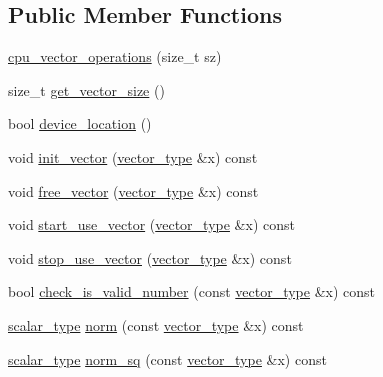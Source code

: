 \subsection*{Public Member Functions}
\begin{DoxyCompactItemize}
\item 
\hyperlink{structcpu__vector__operations_a7148d35e213ce857bd4317b9b7d13fc7}{cpu\-\_\-vector\-\_\-operations} (size\-\_\-t sz)
\item 
size\-\_\-t \hyperlink{structcpu__vector__operations_ab69afb698fb1beed0dc6cc33b7a556ba}{get\-\_\-vector\-\_\-size} ()
\item 
bool \hyperlink{structcpu__vector__operations_aa4a7a448ded0cac8ebc34881d9442912}{device\-\_\-location} ()
\item 
void \hyperlink{structcpu__vector__operations_a8e3da0067d3368df889f4559ca5df94c}{init\-\_\-vector} (\hyperlink{structcpu__vector__operations_a1962836df596ce262704d208e9a6d8f9}{vector\-\_\-type} \&x) const 
\item 
void \hyperlink{structcpu__vector__operations_ab611343789ba4dab20b9d162b4963789}{free\-\_\-vector} (\hyperlink{structcpu__vector__operations_a1962836df596ce262704d208e9a6d8f9}{vector\-\_\-type} \&x) const 
\item 
void \hyperlink{structcpu__vector__operations_a36ce15d54cfb2b08aeeb25d7e601e342}{start\-\_\-use\-\_\-vector} (\hyperlink{structcpu__vector__operations_a1962836df596ce262704d208e9a6d8f9}{vector\-\_\-type} \&x) const 
\item 
void \hyperlink{structcpu__vector__operations_ab79fb826fdea7cc2a301e9db9bdc705e}{stop\-\_\-use\-\_\-vector} (\hyperlink{structcpu__vector__operations_a1962836df596ce262704d208e9a6d8f9}{vector\-\_\-type} \&x) const 
\item 
bool \hyperlink{structcpu__vector__operations_a1a662c7c6f4dba1119c5dd63777ef2ab}{check\-\_\-is\-\_\-valid\-\_\-number} (const \hyperlink{structcpu__vector__operations_a1962836df596ce262704d208e9a6d8f9}{vector\-\_\-type} \&x) const 
\item 
\hyperlink{structcpu__vector__operations_aca6b216aa1fb172df83d98350e94fd61}{scalar\-\_\-type} \hyperlink{structcpu__vector__operations_abb4a0ddd5d65ef1ae8c979e71da96ba8}{norm} (const \hyperlink{structcpu__vector__operations_a1962836df596ce262704d208e9a6d8f9}{vector\-\_\-type} \&x) const 
\item 
\hyperlink{structcpu__vector__operations_aca6b216aa1fb172df83d98350e94fd61}{scalar\-\_\-type} \hyperlink{structcpu__vector__operations_a1b0b4340efbf9e5206aab386097584ca}{norm\-\_\-sq} (const \hyperlink{structcpu__vector__operations_a1962836df596ce262704d208e9a6d8f9}{vector\-\_\-type} \&x) const 

\end{DoxyCompactItemize}
